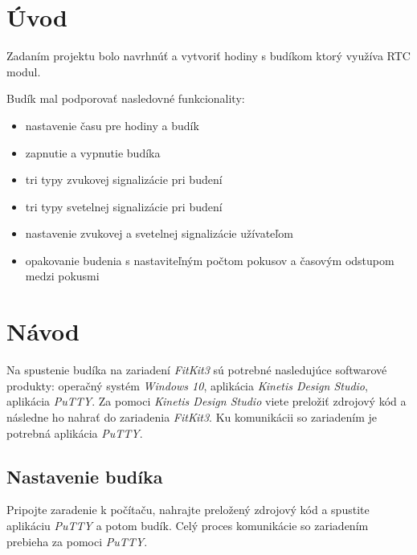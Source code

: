 \documentclass[11pt,a4paper]{article}
\begin{document}

\setlength{\parskip}{0pt}
\hypersetup{hidelinks}\tableofcontents
\setlength{\parskip}{0pt}

\newpage %

\section{Úvod}

    Zadaním projektu bolo navrhnúť a vytvoriť hodiny s budíkom ktorý využíva RTC modul.

    Budík mal podporovať nasledovné funkcionality:
    \begin{itemize}
        \item nastavenie času pre hodiny a budík
        \item zapnutie a vypnutie budíka
        \item tri typy zvukovej signalizácie pri budení
        \item tri typy svetelnej signalizácie pri budení
        \item nastavenie zvukovej a svetelnej signalizácie užívateľom
        \item opakovanie budenia s nastaviteľným počtom pokusov a časovým odstupom medzi pokusmi
    \end{itemize}


\section{Návod}

    \indent Na spustenie budíka na zariadení \textit{FitKit3} sú potrebné nasledujúce softwarové produkty: operačný systém \textit{Windows 10}, aplikácia \textit{Kinetis Design Studio}, aplikácia \textit{PuTTY}. Za pomoci \textit{Kinetis Design Studio} viete preložiť zdrojový kód a následne ho nahrať do zariadenia \textit{FitKit3}. Ku komunikácii so zariadením je potrebná aplikácia \textit{PuTTY}.

    \subsection{Nastavenie budíka}

        \indent Pripojte zaradenie k počítaču, nahrajte preložený zdrojový kód a spustite aplikáciu \textit{PuTTY} a potom budík. Celý proces komunikácie so zariadením prebieha za pomoci \textit{PuTTY}.\\
\end{document}
